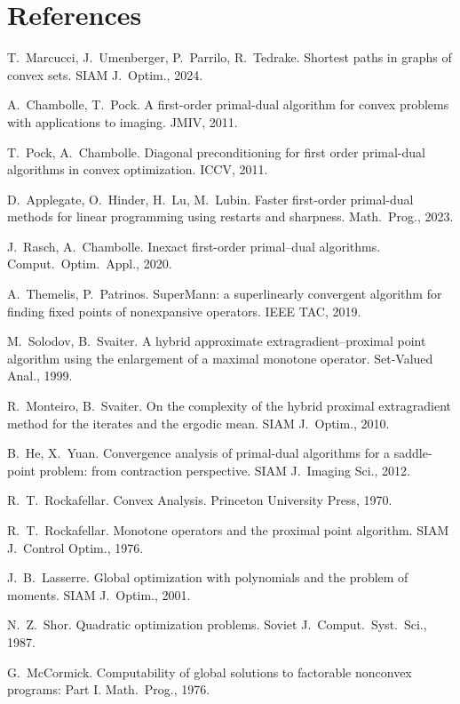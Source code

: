 \documentclass[11pt]{article}
\theoremstyle{plain}
\theoremstyle{definition}
\theoremstyle{remark}
\begin{document}
\section*{References}
\small\raggedright
\begin{enumerate}[label={[\arabic*]},leftmargin=2em,itemsep=0pt]
  \item T.~Marcucci, J.~Umenberger, P.~Parrilo, R.~Tedrake. Shortest paths in graphs of convex sets. SIAM J.\ Optim., 2024.
  \item A.~Chambolle, T.~Pock. A first-order primal-dual algorithm for convex problems with applications to imaging. JMIV, 2011.
  \item T.~Pock, A.~Chambolle. Diagonal preconditioning for first order primal-dual algorithms in convex optimization. ICCV, 2011.
  \item D.~Applegate, O.~Hinder, H.~Lu, M.~Lubin. Faster first-order primal-dual methods for linear programming using restarts and sharpness. Math.\ Prog., 2023.
  \item J.~Rasch, A.~Chambolle. Inexact first-order primal--dual algorithms. Comput.\ Optim.\ Appl., 2020.
  \item A.~Themelis, P.~Patrinos. SuperMann: a superlinearly convergent algorithm for finding fixed points of nonexpansive operators. IEEE TAC, 2019.
  \item M.~Solodov, B.~Svaiter. A hybrid approximate extragradient--proximal point algorithm using the enlargement of a maximal monotone operator. Set-Valued Anal., 1999.
  \item R.~Monteiro, B.~Svaiter. On the complexity of the hybrid proximal extragradient method for the iterates and the ergodic mean. SIAM J.\ Optim., 2010.
  \item B.~He, X.~Yuan. Convergence analysis of primal-dual algorithms for a saddle-point problem: from contraction perspective. SIAM J.\ Imaging Sci., 2012.
  \item R.~T.~Rockafellar. Convex Analysis. Princeton University Press, 1970.
  \item R.~T.~Rockafellar. Monotone operators and the proximal point algorithm. SIAM J.\ Control Optim., 1976.
  \item J.~B.~Lasserre. Global optimization with polynomials and the problem of moments. SIAM J.\ Optim., 2001.
  \item N.~Z.~Shor. Quadratic optimization problems. Soviet J.\ Comput.\ Syst.\ Sci., 1987.
  \item G.~McCormick. Computability of global solutions to factorable nonconvex programs: Part I. Math.\ Prog., 1976.

\end{enumerate}
\end{document}
